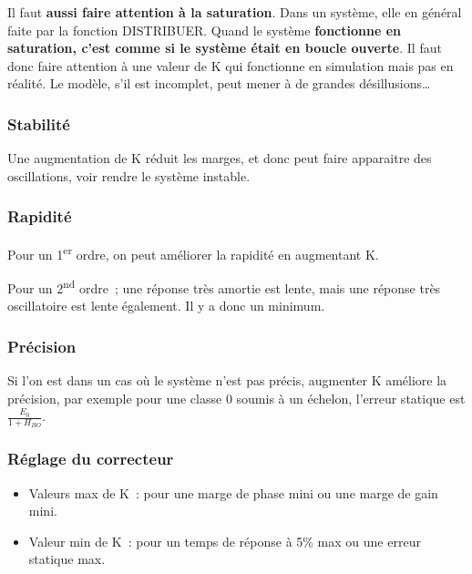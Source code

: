 Il faut \textbf{aussi faire attention à la saturation}. Dans un système, elle en général faite par la fonction DISTRIBUER. Quand le système \textbf{fonctionne en saturation, c'est comme si le système était en boucle ouverte}. Il faut donc faire attention à une valeur de K qui fonctionne en simulation mais pas en réalité. Le modèle, s'il est incomplet, peut mener à de grandes désillusions\ldots{}

\hypertarget{stabilituxe9}{%
\subsubsection*{Stabilité}\label{stabilituxe9}}

Une augmentation de K réduit les marges, et donc peut faire apparaitre des oscillations, voir rendre le système instable.

\hypertarget{rapidituxe9}{%
\subsubsection*{Rapidité}\label{rapidituxe9}}

Pour un 1\textsuperscript{er} ordre, on peut améliorer la rapidité en augmentant K.

Pour un 2\textsuperscript{nd} ordre~; une réponse très amortie est lente, mais une réponse très oscillatoire est lente également. Il y a donc un minimum.

\hypertarget{pruxe9cision}{%
\subsubsection*{Précision}\label{pruxe9cision}}

Si l'on est dans un cas où le système n'est pas précis, augmenter K améliore la précision, par exemple pour une classe 0 soumis à un échelon, l'erreur statique est \(\frac{E_{0}}{1 + H_{BO}}\).

\hypertarget{ruxe9glage-du-correcteur}{%
\subsubsection*{Réglage du correcteur}\label{ruxe9glage-du-correcteur}}

\begin{itemize}
\item
  Valeurs max de K~: pour une marge de phase mini ou une marge de gain mini.
\item
  Valeur min de K~: pour un temps de réponse à 5\% max ou une erreur statique max.
\end{itemize}

